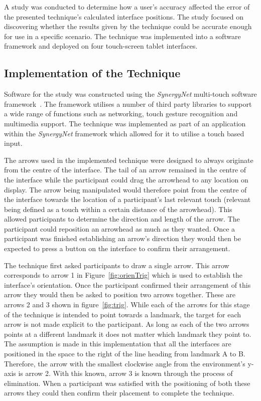 \documentclass{bmcart}
\begin{document}
A study was conducted to determine how a user's accuracy affected the error of the presented technique's calculated interface positions.
The study focused on discovering whether the results given by the technique could be accurate enough for use in a specific scenario.
The technique was implemented into a software framework and deployed on four touch-screen tablet interfaces.

\subsection*{Implementation of the Technique}\label{sec:implementation}

Software for the study was constructed using the {\emph{SynergyNet}} multi-touch software framework~\cite{AlAgha2010}.
The framework utilises a number of third party libraries to support a wide range of functions such as networking, touch gesture recognition and multimedia support.
The technique was implemented as part of an application within the {\emph{SynergyNet}} framework which allowed for it to utilise a touch based input.

The arrows used in the implemented technique were designed to always originate from the centre of the interface.
The tail of an arrow remained in the centre of the interface while the participant could drag the arrowhead to any location on display.
The arrow being manipulated would therefore point from the centre of the interface towards the location of a participant's last relevant touch (relevant being defined as a touch within a certain distance of the arrowhead).
This allowed participants to determine the direction and length of the arrow.
The participant could reposition an arrowhead as much as they wanted.
Once a participant was finished establishing an arrow's direction they would then be expected to press a button on the interface to confirm their arrangement.

The technique first asked participants to draw a single arrow.
This arrow corresponds to arrow 1 in Figure~\ref{fig:orienTrig} which is used to establish the interface's orientation.
Once the participant confirmed their arrangement of this arrow they would then be asked to position two arrows together.
These are arrows 2 and 3 shown in figure~\ref{fig:trig}.
While each of the arrows for this stage of the technique is intended to point towards a landmark, the target for each arrow is not made explicit to the participant.
As long as each of the two arrows points at a different landmark it does not matter which landmark they point to.
The assumption is made in this implementation that all the interfaces are positioned in the space to the right of the line heading from landmark A to B.
Therefore, the arrow with the smallest clockwise angle from the environment's y-axis is arrow 2.
With this known, arrow 3 is known through the process of elimination.
When a participant was satisfied with the positioning of both these arrows they could then confirm their placement to complete the technique.
\end{document}
